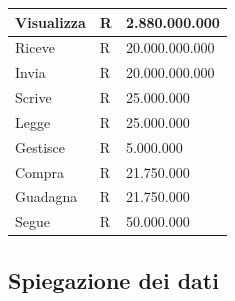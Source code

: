\begin{center}
\begin{tabular}{ |p{5cm}|p{2cm}|p{4cm}|  }
 \hline
 Visualizza & R &  2.880.000.000\\
 \hline
 Riceve & R & 20.000.000.000\\
 \hline
 Invia & R & 20.000.000.000\\
 \hline
 Scrive & R & 25.000.000\\
 \hline
 Legge & R & 25.000.000\\
 \hline
 Gestisce & R & 5.000.000\\
 \hline
 Compra & R & 21.750.000\\
 \hline
 Guadagna & R & 21.750.000\\
 \hline
 Segue & R & 50.000.000\\
 \hline
\end{tabular}
\end{center}

\newpage
\subsection{Spiegazione dei dati}
